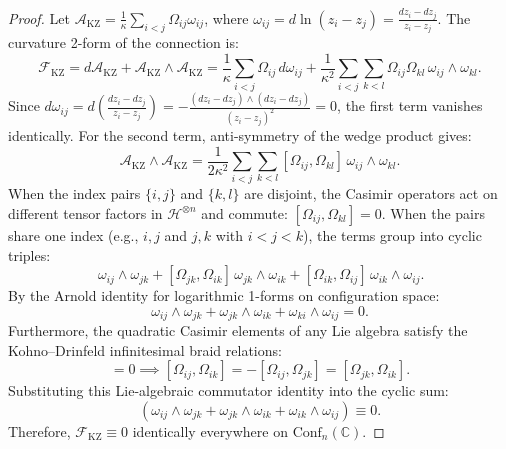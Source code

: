 \documentclass[11pt,onecolumn]{article}
\begin{document}
\begin{proof}
Let $\mathcal{A}_{\text{KZ}} = \frac{1}{\kappa} \sum_{i<j} \Omega_{ij} \omega_{ij}$, where $\omega_{ij} = d\ln(z_i - z_j) = \frac{dz_i - dz_j}{z_i - z_j}$. The curvature 2-form of the connection is:
\begin{equation}
\mathcal{F}_{\text{KZ}} = d\mathcal{A}_{\text{KZ}} + \mathcal{A}_{\text{KZ}} \wedge \mathcal{A}_{\text{KZ}} = \frac{1}{\kappa} \sum_{i<j} \Omega_{ij} \, d\omega_{ij} + \frac{1}{\kappa^2} \sum_{i<j} \sum_{k<l} \Omega_{ij}\Omega_{kl} \, \omega_{ij} \wedge \omega_{kl}.
\end{equation}
Since $d\omega_{ij} = d\left(\frac{dz_i - dz_j}{z_i - z_j}\right) = -\frac{(dz_i - dz_j) \wedge (dz_i - dz_j)}{(z_i - z_j)^2} = 0$, the first term vanishes identically. For the second term, anti-symmetry of the wedge product gives:
\begin{equation}
\mathcal{A}_{\text{KZ}} \wedge \mathcal{A}_{\text{KZ}} = \frac{1}{2\kappa^2} \sum_{i<j} \sum_{k<l} [\Omega_{ij}, \Omega_{kl}] \, \omega_{ij} \wedge \omega_{kl}.
\end{equation}
When the index pairs $\{i, j\}$ and $\{k, l\}$ are disjoint, the Casimir operators act on different tensor factors in $\mathcal{H}^{\otimes n}$ and commute: $[\Omega_{ij}, \Omega_{kl}] = 0$. When the pairs share one index (e.g., $i, j$ and $j, k$ with $i < j < k$), the terms group into cyclic triples:
\begin{equation}
[\Omega_{ij}, \Omega_{jk}] \, \omega_{ij} \wedge \omega_{jk} + [\Omega_{jk}, \Omega_{ik}] \, \omega_{jk} \wedge \omega_{ik} + [\Omega_{ik}, \Omega_{ij}] \, \omega_{ik} \wedge \omega_{ij}.
\end{equation}
By the Arnold identity for logarithmic 1-forms on configuration space:
\begin{equation}
\omega_{ij} \wedge \omega_{jk} + \omega_{jk} \wedge \omega_{ik} + \omega_{ki} \wedge \omega_{ij} = 0.
\end{equation}
Furthermore, the quadratic Casimir elements of any Lie algebra satisfy the Kohno--Drinfeld infinitesimal braid relations:
\begin{equation}
[\Omega_{ij}, \Omega_{ik} + \Omega_{jk}] = 0 \implies [\Omega_{ij}, \Omega_{ik}] = -[\Omega_{ij}, \Omega_{jk}] = [\Omega_{jk}, \Omega_{ik}].
\end{equation}
Substituting this Lie-algebraic commutator identity into the cyclic sum:
\begin{equation}
[\Omega_{ij}, \Omega_{jk}] \left( \omega_{ij} \wedge \omega_{jk} + \omega_{jk} \wedge \omega_{ik} + \omega_{ik} \wedge \omega_{ij} \right) \equiv 0.
\end{equation}
Therefore, $\mathcal{F}_{\text{KZ}} \equiv 0$ identically everywhere on $\mathrm{Conf}_n(\mathbb{C})$.


\end{proof}
\end{document}
